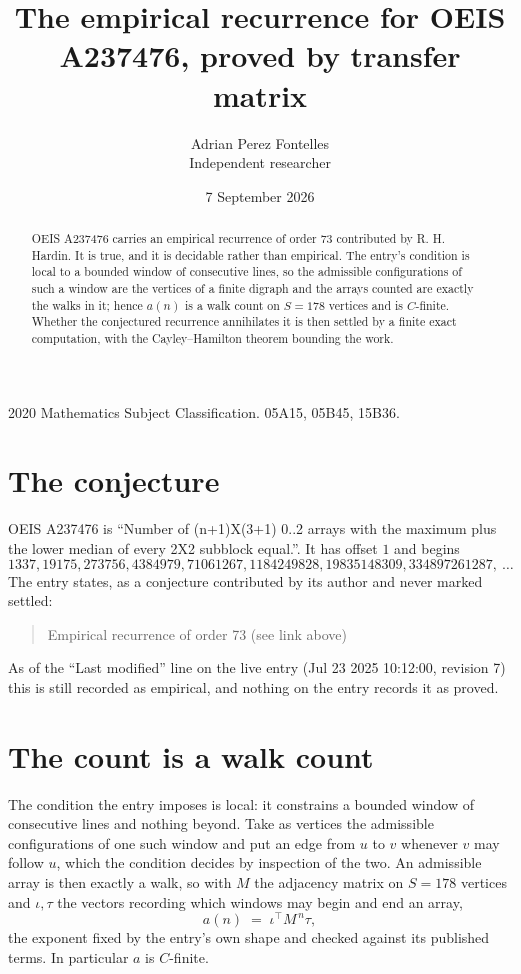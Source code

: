 \documentclass[11pt,a4paper]{article}
\title{The empirical recurrence for OEIS A237476, proved by transfer matrix}
\author{Adrian Perez Fontelles\\ \small Independent researcher}
\date{7 September 2026}
\theoremstyle{plain}
\theoremstyle{definition}
\begin{document}
\maketitle

\begin{abstract}
OEIS A237476 carries an empirical recurrence of order $73$ contributed by R. H. Hardin. It is
true, and it is decidable rather than empirical. The entry's condition is local to a bounded window of consecutive lines, so
the admissible configurations of such a window are the vertices of a finite digraph and the
arrays counted are exactly the walks in it; hence $a(n)$ is a walk count on $S=178$ vertices
and is $C$-finite. Whether the conjectured recurrence annihilates it is then settled by a
finite exact computation, with the Cayley--Hamilton theorem bounding the work.
\end{abstract}

\noindent\small 2020 Mathematics Subject Classification. 05A15, 05B45, 15B36.\normalsize

\section{The conjecture}

OEIS A237476 is ``Number of (n+1)X(3+1) 0..2 arrays with the maximum plus the lower median of every 2X2 subblock equal.''. It has offset $1$ and begins
\[
1337, 19175, 273756, 4384979, 71061267, 1184249828, 19835148309, 334897261287,\ \dots
\]
The entry states, as a conjecture contributed by its author and never marked settled:
\begin{quote}
Empirical recurrence of order 73 (see link above)
\end{quote}
As of the ``Last modified'' line on the live entry (Jul 23 2025 10:12:00, revision 7) this is still
recorded as empirical, and nothing on the entry records it as proved.

\section{The count is a walk count}

The condition the entry imposes is local: it constrains a bounded window of consecutive lines and nothing beyond. Take as
vertices the admissible configurations of one such window and put an edge from $u$ to $v$
whenever $v$ may follow $u$, which the condition decides by inspection of the two. An
admissible array is then exactly a walk, so with $M$ the adjacency matrix on $S=178$ vertices
and $\iota,\tau$ the vectors recording which windows may begin and end an array,
\[
a(n)\;=\;\iota^{\!\top}M^{\,n}\tau ,
\]
the exponent fixed by the entry's own shape and checked against its published terms. In
particular $a$ is $C$-finite.
\end{document}

